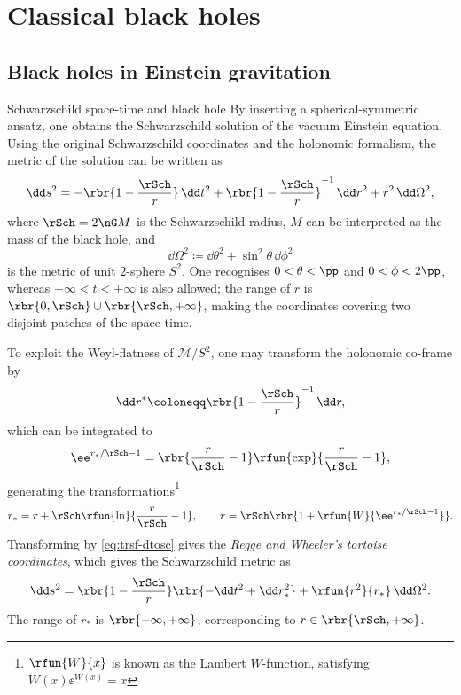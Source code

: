 \chapter{Classical black holes}

\section{Black holes in Einstein gravitation}

\begin{nameddef}{Schwarzschild space-time and black hole}
By inserting a spherical-symmetric ansatz, one obtains the Schwarzschild 
solution of the vacuum Einstein equation. Using the original Schwarzschild 
coordinates and the holonomic formalism, the metric of the solution can be 
written as
\begin{equation}
\dd s^2 = -\rbr{1-\frac{\rSch}{r}}\,\dd t^2+\rbr{1-\frac{\rSch}{r}}^{-1}
\,\dd r^2 + r^2\,\dd\Omega^2,
\label{eq:schwarzschild}
\end{equation}
where $\rSch = 2\nG M$ is the Schwarzschild radius, $M$ can be interpreted 
as the mass of the black hole, and
\begin{equation}
\dd\Omega^2 \coloneqq \dd\theta^2 + \sin^2\theta\,\dd\phi^2
\end{equation}
is the metric of unit $2$-sphere $S^2$. One recognises $0 < \theta < \pp$ and 
$0 < \phi < 2\pp$, whereas $-\infty < t < +\infty$ is also allowed;
the range of $r$ is $\rbr{0, \rSch} \cup \rbr{\rSch, +\infty}$, making the 
coordinates covering two disjoint patches of the space-time.

To exploit the Weyl-flatness of $\mathcal{M}/S^2$, one may transform the
holonomic co-frame by
\begin{equation}
\dd r^* \coloneqq \rbr{1-\frac{\rSch}{r}}^{-1}\,\dd r,
\label{eq:trsf-dtosc}
\end{equation}
which can be integrated to
\begin{equation}
\ee^{r_*/\rSch-1} =
\rbr{\frac{r}{\rSch}-1}\rfun{\exp}{\frac{r}{\rSch}-1},
\label{eq:trsf-gtosc}
\end{equation}
generating the transformations\footnote{$\rfun{W}{x}$ is known as the Lambert 
$W$-function, satisfying $W(x)\ee^{W(x)} = x$}
\begin{equation}
r_* = r+\rSch\rfun{\ln}{\frac{r}{\rSch}-1},\qquad
r = \rSch\rbr{1+\rfun{W}{\ee^{r_*/\rSch-1}}}.
\end{equation}
Transforming by \cref{eq:trsf-dtosc} gives the \emph{Regge and Wheeler's 
tortoise coordinates}, which gives the Schwarzschild metric as
\begin{equation}
\dd s^2 = \rbr{1-\frac{\rSch}{r}}\rbr{ -\dd t^2 + \dd r_*^2}
+ \rfun{r^2}{r_*}\,\dd\Omega^2.
\end{equation}
The range of $r_*$ is $\rbr{-\infty, +\infty}$, corresponding to
$r \in \rbr{\rSch, +\infty}$.


\end{nameddef}
